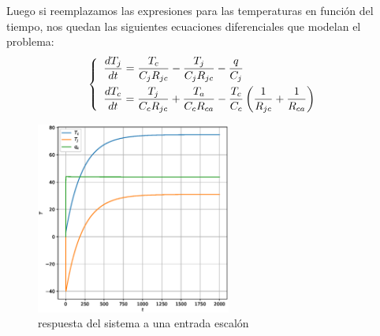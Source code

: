 \documentclass[10pt]{article}
\begin{document}
Luego si reemplazamos las expresiones para las temperaturas en función del tiempo, nos quedan las siguientes ecuaciones diferenciales que modelan el problema:
\begin{equation}
\medskip
\label{eq:diferenciales}
   \left\{
      \begin{array}{ll}
         \dfrac{dT_{j}}{dt}=\dfrac{T_{c}}{C_{j}R_{jc}}-\dfrac{T_{j}}{C_{j}R_{jc}}-\dfrac{q}{C_{j}}\\[10pt] %
         \dfrac{dT_{c}}{dt}=\dfrac{T_{j}}{C_{c}R_{jc}}+\dfrac{T_{a}}{C_{c}R_{ca}}-\dfrac{T_{c}}{C_{c}}\left(\dfrac{1}{R_{jc}}+\dfrac{1}{R_{ca}}\right)
      \end{array}
   \right.
\end{equation}

\begin{figure}[H]
   \centering
   \includegraphics[width=0.57\textwidth]{Images/sin_disipador_step.eps}
   \caption{respuesta del sistema a una entrada escalón}\label{fig:sin_disipador_step}
\end{figure}

\end{document}
